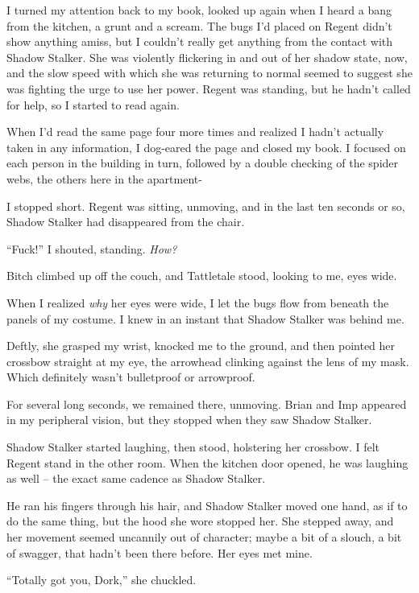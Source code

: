 I turned my attention back to my book, looked up again when I heard a bang from the kitchen, a grunt and a scream.  The bugs I'd placed on Regent didn't show anything amiss, but I couldn't really get anything from the contact with Shadow Stalker.  She was violently flickering in and out of her shadow state, now, and the slow speed with which she was returning to normal seemed to suggest she was fighting the urge to use her power.  Regent was standing, but he hadn't called for help, so I started to read again.



When I'd read the same page four more times and realized I hadn't actually taken in any information, I dog-eared the page and closed my book.  I focused on each person in the building in turn, followed by a double checking of the spider webs, the others here in the apartment-



I stopped short.  Regent was sitting, unmoving, and in the last ten seconds or so, Shadow Stalker had disappeared from the chair.



``Fuck!'' I shouted, standing.  \emph{How?}



Bitch climbed up off the couch, and Tattletale stood, looking to me, eyes wide.



When I realized \emph{why} her eyes were wide, I let the bugs flow from beneath the panels of my costume.  I knew in an instant that Shadow Stalker was behind me.



Deftly, she grasped my wrist, knocked me to the ground, and then pointed her crossbow straight at my eye, the arrowhead clinking against the lens of my mask.  Which definitely wasn't bulletproof or arrowproof.



For several long seconds, we remained there, unmoving.  Brian and Imp appeared in my peripheral vision, but they stopped when they saw Shadow Stalker.



Shadow Stalker started laughing, then stood, holstering her crossbow.  I felt Regent stand in the other room.  When the kitchen door opened, he was laughing as well – the exact same cadence as Shadow Stalker.



He ran his fingers through his hair, and Shadow Stalker moved one hand, as if to do the same thing, but the hood she wore stopped her.  She stepped away, and her movement seemed uncannily out of character; maybe a bit of a slouch, a bit of swagger, that hadn't been there before.  Her eyes met mine.



``Totally got you, Dork,'' she chuckled.





